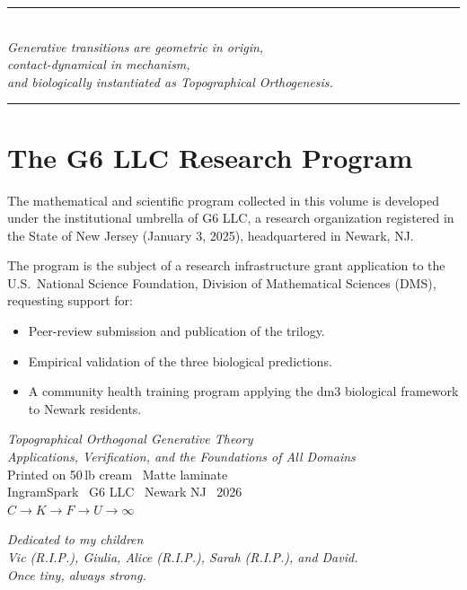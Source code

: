 \begin{center}
\rule{0.5\textwidth}{0.4pt}\\[0.6em]
\textit{Generative transitions are geometric in origin,\\
contact-dynamical in mechanism,\\
and biologically instantiated as Topographical Orthogenesis.}\\[0.6em]
\rule{0.5\textwidth}{0.4pt}
\end{center}

\section*{The G6 LLC Research Program}

The mathematical and scientific program collected in this volume is developed
under the institutional umbrella of G6 LLC, a research organization registered
in the State of New Jersey (January 3, 2025), headquartered in Newark, NJ.

The program is the subject of a research infrastructure grant application to
the U.S.\ National Science Foundation, Division of Mathematical Sciences (DMS),
requesting support for:
\begin{itemize}
\item Peer-review submission and publication of the trilogy.
\item Empirical validation of the three biological predictions.
\item A community health training program applying the dm3 biological
      framework to Newark residents.
\end{itemize}
\cleardoublepage
\thispagestyle{empty}
\vspace*{\fill}
\begin{center}
\small
\textit{Topographical Orthogonal Generative Theory}\\
\textit{Applications, Verification, and the Foundations of All Domains}\\[1em]
Printed on 50\,lb cream \textperiodcentered\ Matte laminate\\
IngramSpark \textperiodcentered\ G6 LLC \textperiodcentered\ Newark NJ \textperiodcentered\ 2026\\[0.5em]
$C \to K \to F \to U \to \infty$
\end{center}
\vspace*{\fill}

\nocite{*}


\thispagestyle{empty}
\vspace*{6cm}
\begin{center}
  \itshape
  Dedicated to my children\\[0.5em]
  Vic (R.I.P.), Giulia, Alice (R.I.P.), Sarah (R.I.P.), and David.\\[1em]
  \normalfont\textit{Once tiny, always strong.}
\end{center}
\cleardoublepage

